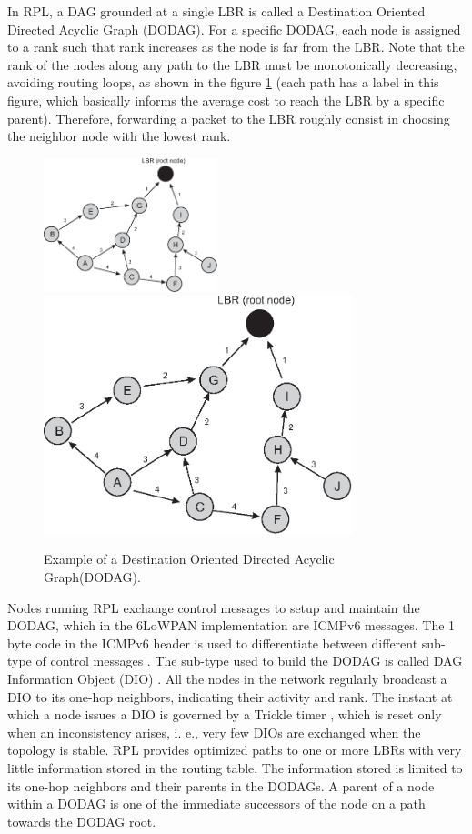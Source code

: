 \documentclass[final,authoryear,3p,twocolumn]{elsarticle}
\begin{document}
In RPL, a DAG grounded at a single LBR is called a Destination Oriented Directed Acyclic Graph (DODAG). For a specific DODAG, each node is assigned to a rank such that rank increases as the node is far from the LBR. Note that the rank of the nodes along any path to the LBR must be monotonically decreasing, avoiding routing loops, as shown in the figure \ref{RPL_DIO} (each path has a label in this figure, which basically informs the average cost to reach the LBR by a specific parent). Therefore, forwarding a packet to the LBR roughly consist in choosing the neighbor node with the lowest rank.

\begin{figure}[h!tb]
\centering
\ifdefined\TWOCOL
\includegraphics[width=0.45\textwidth]{figures/RPL_DIO}
\else
\includegraphics[width=0.8\textwidth]{RPL_DIO}
\fi
\caption{Example of a Destination Oriented Directed Acyclic Graph(DODAG).}
\label{RPL_DIO}
\end{figure}

Nodes running RPL exchange control messages to setup and maintain the DODAG, which in the 6LoWPAN implementation are ICMPv6 messages. The 1 byte code in the ICMPv6 header is used to differentiate between different sub-type of control messages \citep{RFC4443}. The sub-type used to build the DODAG is called DAG Information Object (DIO) \citep{RFC6550}. All the nodes in the network regularly broadcast a DIO to its one-hop neighbors, indicating their activity and rank. The instant at which a node issues a DIO is governed by a Trickle timer \citep{trickle}, which is reset only when an inconsistency arises, i. e., very few DIOs are exchanged when the topology is stable. RPL provides optimized paths to one or more LBRs with very little information stored in the routing table. The information stored is limited to its one-hop neighbors and their parents in the DODAGs. A parent of a node within a DODAG is one of the immediate successors of the node on a path towards the DODAG root.
\end{document}
